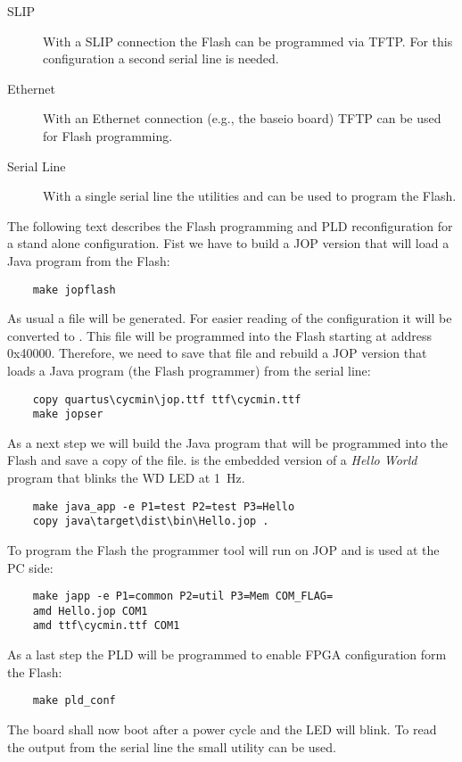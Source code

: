 \begin{description}
  \item[SLIP] With a SLIP connection the Flash can be programmed
      via TFTP. For this configuration a second serial line is
      needed.
  \item[Ethernet] With an Ethernet connection (e.g., the baseio
      board) TFTP can be used for Flash programming.
  \item[Serial Line] With a single serial line the utilities
       and  can be used to
      program the Flash.
\end{description}

The following text describes the Flash programming and PLD
reconfiguration for a stand alone configuration. Fist we have to
build a JOP version that will load a Java program from the Flash:
\begin{verbatim}
    make jopflash
\end{verbatim}
As usual a  file will be generated. For easier reading
of the configuration it will be converted to . This
file will be programmed into the Flash starting at address 0x40000.
Therefore, we need to save that file and rebuild a JOP version that
loads a Java program (the Flash programmer) from the serial line:
\begin{verbatim}
    copy quartus\cycmin\jop.ttf ttf\cycmin.ttf
    make jopser
\end{verbatim}
As a next step we will build the Java program that will be programmed
into the Flash and save a copy of the  file.
 is the embedded version of a \emph{Hello World}
program that blinks the WD LED at 1~Hz.
\begin{verbatim}
    make java_app -e P1=test P2=test P3=Hello
    copy java\target\dist\bin\Hello.jop .
\end{verbatim}
To program the Flash the programmer tool  will run on
JOP and  is used at the PC side:
\begin{verbatim}
    make japp -e P1=common P2=util P3=Mem COM_FLAG=
    amd Hello.jop COM1
    amd ttf\cycmin.ttf COM1
\end{verbatim}
As a last step the PLD will be programmed to enable FPGA
configuration form the Flash:
\begin{verbatim}
    make pld_conf
\end{verbatim}
The board shall now boot after a power cycle and the LED will blink.
To read the output from the serial line the small utility
 can be used.


